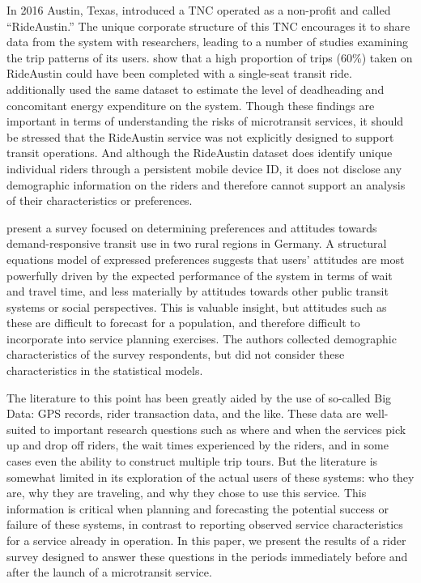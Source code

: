 \documentclass[smartcities,article,submit,moreauthors,pdftex]{mdpi}
\begin{document}
In 2016 Austin, Texas, introduced a TNC operated as a non-profit and called
``RideAustin.'' The unique corporate structure of this TNC encourages it to share
data from the system with researchers, leading to a number of studies examining
the trip patterns of its users. \citet{Komanduri2018} show that a high proportion of
trips (60\%) taken on RideAustin could have been completed with a single-seat
transit ride. \citet{Wenzel2019} additionally used the same dataset to estimate the
level of deadheading and concomitant energy expenditure on the system. Though
these findings are important in terms of understanding the risks of microtransit
services, it should be stressed that the RideAustin service was not explicitly designed
to support transit operations. And although the RideAustin dataset does identify
unique individual riders through a persistent mobile device ID, it does not
disclose any demographic information on the riders and therefore cannot support
an analysis of their characteristics or preferences.

\citet{KONIG2020954} present a survey focused on determining preferences and
attitudes towards demand-responsive transit use in two rural regions in
Germany. A structural equations model of expressed preferences suggests that
users' attitudes are most powerfully driven by the expected performance of the
system in terms of wait and travel time, and less materially by attitudes
towards other public transit systems or social perspectives. This is valuable
insight, but attitudes such as these are difficult to forecast for a population,
and therefore difficult to incorporate into service planning exercises. The
authors collected demographic characteristics of the survey respondents, but did
not consider these characteristics in the statistical models.

The literature to this point has been greatly aided by the use of so-called Big
Data: GPS records, rider transaction data, and the like. These data are
well-suited to important research questions such as where and when the services
pick up and drop off riders, the wait times experienced by the riders, and in
some cases even the ability to construct multiple trip tours. But the literature
is somewhat limited in its exploration of the actual users of
these systems: who they are, why they are traveling, and why they chose to use
this service. This information is critical when planning and forecasting the
potential success or failure of these systems, in contrast to reporting observed
service characteristics for a service already in operation. In this paper, we
present the results of a rider survey designed to answer these questions in the
periods immediately before and after the launch of a
microtransit service.
\end{document}
